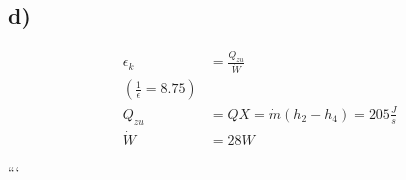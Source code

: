 

\subsection*{d)}

\begin{align*}
\epsilon_k &= \frac{Q_{zu}}{\dot{W}} \\
\left( \frac{1}{\epsilon} = 8.75 \right) \\
Q_{zu} &= QX = \dot{m} (h_2 - h_4) = 205 \frac{J}{s} \\
\dot{W} &= 28 W
\end{align*}

```